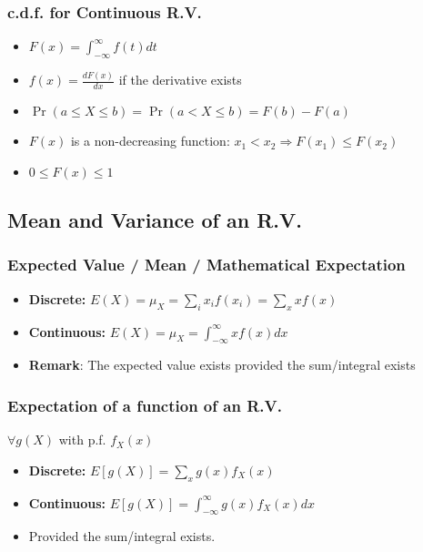 \documentclass[10pt]{article}
\begin{document}
\subsubsection*{c.d.f. for Continuous R.V.}
\begin{itemize}
    \item $F(x) = \int_{-\infty}^{\infty}f(t)dt$
    \item $f(x) = \frac{dF(x)}{dx}$ if the derivative exists
    \item $\Pr(a\leq X \leq b) = \Pr(a < X \leq b) = F(b) - F(a)$
    \item $F(x)$ is a non-decreasing function: $x_1<x_2 \Rightarrow F(x_1) \leq F(x_2)$
    \item $0 \leq F(x) \leq 1$
\end{itemize}


\subsection*{Mean and Variance of an R.V.}
\subsubsection*{Expected Value / Mean / Mathematical Expectation}
\begin{itemize}
    \item \textbf{Discrete:} $E(X) = \mu^{}_X = \sum_i^{} x_i f(x_i) = \sum_x^{} x f(x)$
    \item \textbf{Continuous:} $E(X) = \mu^{}_X = \int_{-\infty}^{\infty}xf(x)dx$
    \item \textbf{Remark}: The expected value exists provided the sum/integral exists
\end{itemize}
\subsubsection*{Expectation of a function of an R.V.}
$\forall g(X)$ with p.f. $f^{}_X(x)$
\begin{itemize}
    \item \textbf{Discrete:} $E[g(X)] = \sum_{x}^{} g(x)f^{}_X (x)$
    \item \textbf{Continuous:} $E[g(X)] = \int_{-\infty}^{\infty} g(x) f_X(x)dx$
    \item Provided the sum/integral exists.
\end{itemize}
\end{document}
